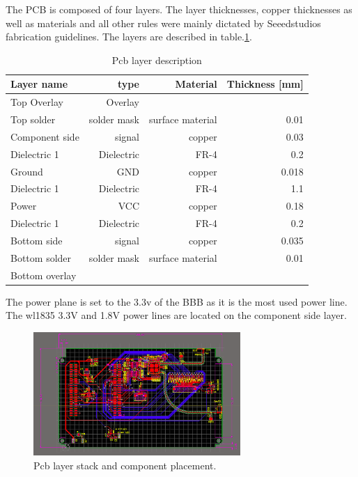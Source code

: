 The PCB is composed of four layers. The layer thicknesses, copper thicknesses as well as materials and all other rules were mainly dictated by Seeedstudios fabrication guidelines. The layers are described in table.\ref{tab:layer description}.

\begin{table}[!htbp]
  \begin{center}
    \begin{tabular}{|l|r|r|r|}%
      \hline
        Layer name & type & Material & Thickness [mm] \\ \hline \hline
        Top Overlay & Overlay & & \\ \hline
        Top solder & solder mask & surface material & 0.01 \\ \hline
        Component side & signal & copper & 0.03 \\ \hline
        Dielectric 1 & Dielectric & FR-4 & 0.2 \\ \hline
        Ground & GND & copper & 0.018\\ \hline
        Dielectric 1 & Dielectric & FR-4 & 1.1 \\ \hline
        Power & VCC & copper & 0.18 \\ \hline
        Dielectric 1 & Dielectric & FR-4 & 0.2 \\ \hline
        Bottom side & signal & copper & 0.035 \\ \hline
        Bottom solder & solder mask & surface material & 0.01 \\ \hline
        Bottom overlay & & &  \\ \hline

    \end{tabular}
  \end{center}
  \caption {Pcb layer description} \label{tab:layer description}
\end{table}

The power plane is set to the 3.3v of the BBB as it is the most used power line. The wl1835 3.3V and 1.8V power lines are located on the component side layer.

\begin{figure}[h]
    \centering
    \includegraphics[width=0.7\textwidth,keepaspectratio]{chap/hardFig/pcb_all_layers}
    \caption{Pcb layer stack and component placement.}
    \label{fig:pcb layer stack}
\end{figure}

